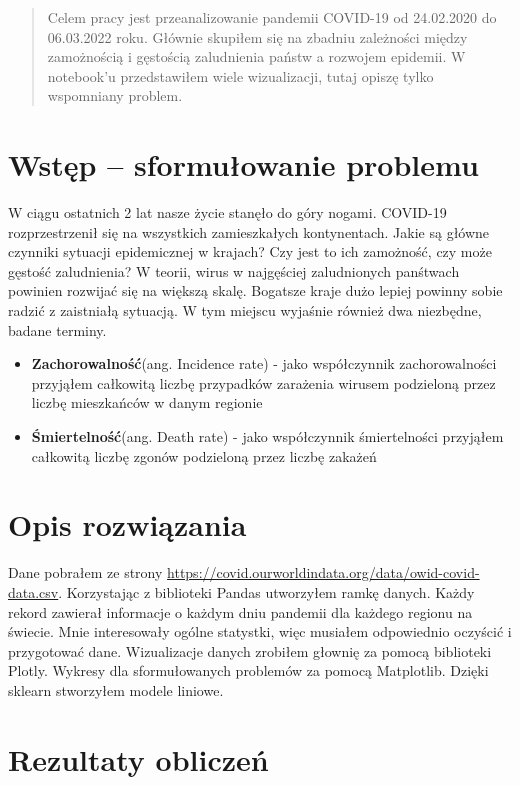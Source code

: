 \documentclass[10pt]{article}
\begin{document}


\begin{abstract}
Celem pracy jest przeanalizowanie pandemii COVID-19 od 24.02.2020 do 06.03.2022 roku. Głównie skupiłem się na zbadniu zależności między zamożnością i gęstością zaludnienia państw a rozwojem epidemii. W notebook'u przedstawiłem wiele wizualizacji, tutaj opiszę tylko wspomniany problem. 
\end{abstract}

\section{Wstęp -- sformułowanie problemu}
\label{sec:wstep}
W ciągu ostatnich 2 lat nasze życie stanęło do góry nogami. COVID-19 rozprzestrzenił się na wszystkich zamieszkałych kontynentach. Jakie są główne czynniki sytuacji epidemicznej w krajach? Czy jest to ich zamożność, czy może gęstość zaludnienia? W teorii, wirus w najgęściej zaludnionych panśtwach powinien rozwijać się na większą skalę. Bogatsze kraje dużo lepiej powinny sobie radzić z zaistniałą sytuacją. W tym miejscu wyjaśnie również dwa niezbędne, badane terminy.

\begin{itemize}
    \item \textbf{Zachorowalność}(ang. Incidence rate) - jako współczynnik zachorowalności przyjąłem całkowitą liczbę przypadków zarażenia wirusem podzieloną przez liczbę mieszkańców w danym regionie
    \item \textbf{Śmiertelność}(ang. Death rate) - jako współczynnik śmiertelności przyjąłem całkowitą liczbę zgonów podzieloną przez liczbę zakażeń
\end{itemize}

\section{Opis rozwiązania} 
 Dane pobrałem ze strony \url{https://covid.ourworldindata.org/data/owid-covid-data.csv}. Korzystając z biblioteki Pandas utworzyłem ramkę danych. Każdy rekord zawierał informacje o każdym dniu pandemii dla każdego regionu na świecie. Mnie interesowały ogólne statystki, więc musiałem odpowiednio oczyścić i przygotować dane. Wizualizacje danych zrobiłem głownię za pomocą biblioteki Plotly. Wykresy dla sformułowanych problemów za pomocą Matplotlib. Dzięki sklearn stworzyłem modele liniowe. 

\section{Rezultaty obliczeń}
\end{document}
